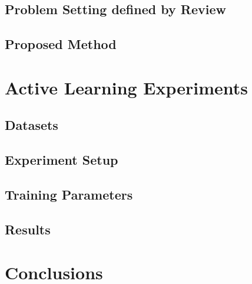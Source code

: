 \subsection{Problem Setting defined by Review}

\subsection{Proposed Method}



\section{Active Learning Experiments}

\subsection{Datasets}

\subsection{Experiment Setup}

\subsection{Training Parameters}

\subsection{Results}



\section{Conclusions}
